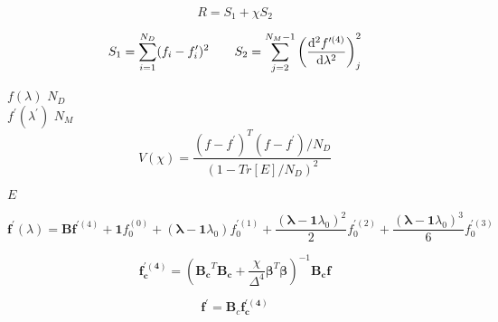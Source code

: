 \documentclass[12pt]{article}
\begin{document}
    \begin{equation}
        R = S_1 + \chi S_2
    \end{equation}

    \begin{equation}
        S_1 = \sum^{N_{D}}_{i=1} (f_i - f^\prime_i)^2 \qquad
        S_2 = \sum^{N_{M} - 1}_{j=2} \left(\frac{{\rm d}^2 f^{\prime (4)}}{{\rm
        d}\lambda^2}\right)^2_j
    \end{equation}

    $f(\lambda)$ $N_D$ \\
    $f^\prime(\lambda^\prime)$ $N_M$ \\


    \begin{equation}
        V(\chi) = \frac{(f - f^\prime)^T (f - f^\prime) / N_D}
                       {(1 - Tr[E] / N_D)^2}
    \end{equation}

    $E$


    \begin{equation}
        \bm{f}^\prime(\lambda) = \bm{B} \bm{f}^{\prime(4)} + \bm{1}f^{(0)}_0+
        (\bm{\lambda} - \bm{1} \lambda_0) f^{\prime(1)}_0 + 
        \frac{(\bm{\lambda} - \bm{1} \lambda_0)^2}{2} f^{\prime(2)}_0 + 
        \frac{(\bm{\lambda} - \bm{1} \lambda_0)^3}{6} f^{\prime(3)}_0
    \end{equation}


    \begin{equation}
        \bm{f^{\prime (4)}_c} = (\bm{B_c}^T \bm{B_c} +
        \frac{\chi}{\Delta^4}\bm{\beta}^T
        \bm{\beta})^{-1} \bm{B_c} \bm{f}
    \end{equation}

    \begin{equation}
        \bm{f^\prime} = \bm{B}_c  \bm{f^{\prime (4)}_c}
    \end{equation}
\end{document}
